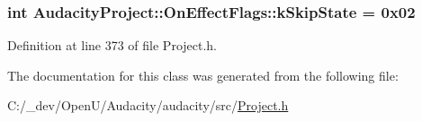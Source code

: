 \subsubsection[{\texorpdfstring{k\+Skip\+State}{kSkipState}}]{ {\bf int} Audacity\+Project\+::\+On\+Effect\+Flags\+::k\+Skip\+State = 0x02\hspace{0.3cm}{\ttfamily [static]}}\hypertarget{class_audacity_project_1_1_on_effect_flags_a4613e4014b6e6b59bd07701bcac4e44f}{}\label{class_audacity_project_1_1_on_effect_flags_a4613e4014b6e6b59bd07701bcac4e44f}


Definition at line 373 of file Project.\+h.



The documentation for this class was generated from the following file\+:\begin{DoxyCompactItemize}
\item 
C\+:/\+\_\+dev/\+Open\+U/\+Audacity/audacity/src/\hyperlink{_project_8h}{Project.\+h}\end{DoxyCompactItemize}
